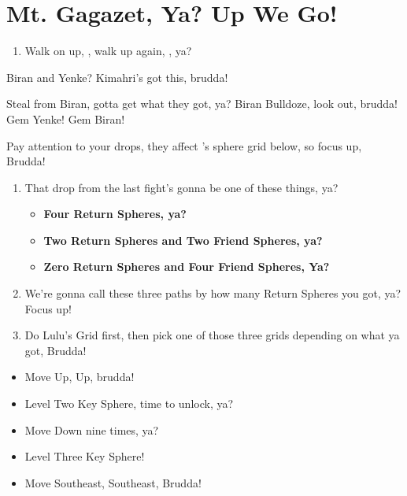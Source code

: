 \chapter{Mt. Gagazet, Ya? Up We Go!}
\begin{enumerate}
\item Walk on up, \cs[3:40], walk up again, \sd, ya?
\end{enumerate}
\begin{battle}{Biran and Yenke? Kimahri's got this, brudda!}
\begin{itemize}
\kimahrif Steal from Biran, gotta get what they got, ya?
\enemyf Biran Bulldoze, look out, brudda!
\kimahrif Gem Yenke!
\kimahrif Gem Biran!
\end{itemize}
Pay attention to your drops, they affect \yuna's sphere grid below, so focus up, Brudda!
\end{battle}
\begin{enumerate}[resume]
\item That drop from the last fight's gonna be one of these things, ya?
\begin{itemize}
\item \textbf{Four Return Spheres, ya?}
\item \textbf{Two Return Spheres and Two Friend Spheres, ya?}
\item \textbf{Zero Return Spheres and Four Friend Spheres, Ya?}
\end{itemize}
\item We're gonna call these three paths by how many Return Spheres you got, ya? Focus up!
\item Do Lulu's Grid first, then pick one of those three grids depending on what ya got, Brudda!
\end{enumerate}
\begin{spheregrid}
\begin{itemize}
\luluf
\begin{itemize}
\item Move Up, Up, brudda!
\item Level Two Key Sphere, time to unlock, ya?
\item Move Down nine times, ya?
\item Level Three Key Sphere!
\item Move Southeast, Southeast, Brudda!
\end{itemize}
\end{itemize}
\end{spheregrid}
